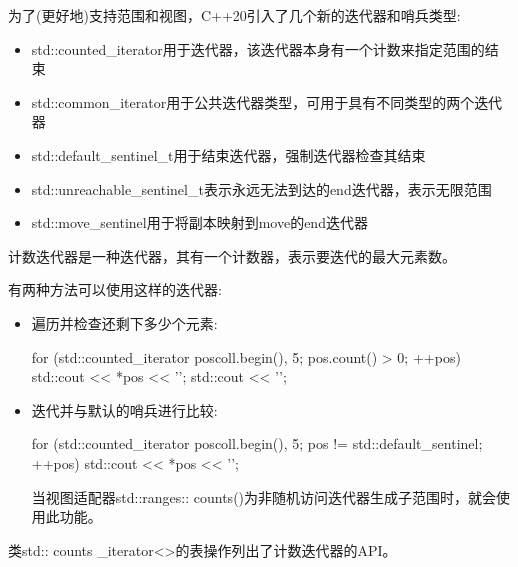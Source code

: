 
为了(更好地)支持范围和视图，C++20引入了几个新的迭代器和哨兵类型:

\begin{itemize}
\item
std::counted\_iterator用于迭代器，该迭代器本身有一个计数来指定范围的结束

\item
std::common\_iterator用于公共迭代器类型，可用于具有不同类型的两个迭代器

\item
std::default\_sentinel\_t用于结束迭代器，强制迭代器检查其结束

\item
std::unreachable\_sentinel\_t表示永远无法到达的end迭代器，表示无限范围

\item
std::move\_sentinel用于将副本映射到move的end迭代器
\end{itemize}


计数迭代器是一种迭代器，其有一个计数器，表示要迭代的最大元素数。

有两种方法可以使用这样的迭代器:

\begin{itemize}
\item
遍历并检查还剩下多少个元素:

\begin{cpp}
for (std::counted_iterator pos{coll.begin(), 5}; pos.count() > 0; ++pos) {
	std::cout << *pos << '\n';
}
std::cout << '\n';
\end{cpp}

\item
迭代并与默认的哨兵进行比较:

\begin{cpp}
for (std::counted_iterator pos{coll.begin(), 5};
pos != std::default_sentinel; ++pos) {
	std::cout << *pos << '\n';
}
\end{cpp}

当视图适配器std::ranges:: counts()为非随机访问迭代器生成子范围时，就会使用此功能。
\end{itemize}

类std:: counts \_iterator<>的表操作列出了计数迭代器的API。

